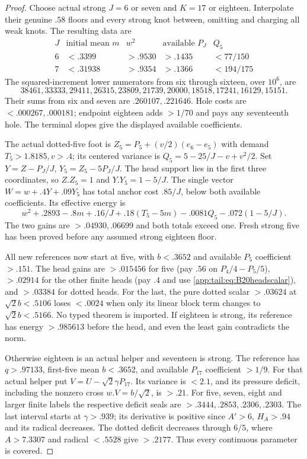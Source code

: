 \documentclass[11pt]{article}
\theoremstyle{definition}
\theoremstyle{remark}
\begin{document}
\begin{proof}
Choose actual strong $J=6$ or seven and $K=17$ or eighteen.
Interpolate their genuine $.58$ floors and every strong knot
between, omitting and charging all weak knots. The resulting data are
\[
\begin{array}{c|c|c|c|c}
J&\text{initial mean }m&w^2&\text{available }P_J&Q_5\\\hline
6&<.3399&>.9530&>.1435&<77/150\\
7&<.31938&>.9354&>.1366&<194/175
\end{array}
\]
The squared-increment lower numerators from six through sixteen,
over $10^6$, are
\[
38461,33333,29411,26315,23809,21739,20000,18518,17241,16129,15151.
\]
Their sums from six and seven are $.260107,.221646$.
Hole costs are $<.000267,.000181$; endpoint eighteen adds
$>1/70$ and pays any seventeenth hole. The terminal slopes give
the displayed available coefficients.

The actual dotted-five foot is
$Z_5=P_5+(v/2)(e_6-e_5)$ with demand $T_5>1.8185,v>.4$;
its centered variance is $Q_5=5-25/J-v+v^2/2$.
Set $Y=Z-P_J/J$, $Y_5=Z_5-5P_J/J$.
The head support lies in the first three coordinates, so
$Z.Z_5=1$ and $Y.Y_5=1-5/J$.
The single vector $W=w+.4Y+.09Y_5$ has total anchor cost
$.85/J$, below both available coefficients. Its effective energy is
\[
 w^2+.2893-.8m+.16/J+.18(T_5-5m)
                     -.0081Q_5-.072(1-5/J).
\]
The two gains are $>.04930,.06699$ and both totals exceed one.
Fresh strong five has been proved before any assumed strong
eighteen floor.

All new references now start at five, with $b<.3652$ and
available $P_5$ coefficient $>.151$.
The head gains are $>.015456$ for five (pay $.56$ on
$P_4/4-P_5/5$), $>.02914$ for the other finite heads
(pay $.4$ and use \eqref{app:tail:eq:B20headscalar}), and
$>.03384$ for dotted heads. For the last, the pure dotted
scalar $>.03624$ at $\sqrt2b<.5106$ loses $<.0024$ when
only its linear block term changes to $\sqrt2b<.5166$.
No typed theorem is imported.
If eighteen is strong, its reference has energy $>.985613$
before the head, and even the least gain contradicts the norm.

Otherwise eighteen is an actual helper and seventeen is strong.
The reference has $q>.97133$, first-five mean $b<.3652$,
and available $P_{17}$ coefficient $>1/9$.
For that actual helper put $V=U-\sqrt2\gamma P_{17}$.
Its variance is $<2.1$, and its pressure deficit, including
the nonzero cross $w.V=b/\sqrt2$, is $>.21$.
For five, seven, eight and larger finite labels the respective
deficit seals are $>.3444,.2853,.2306,.2303$.
The last interval starts at $\gamma>.939$; its derivative is
positive since $A'>6$, $H_A>.94$ and its radical decreases.
The dotted deficit decreases through $6/5$, where
$A>7.3307$ and radical $<.5528$ give $>.2177$.
Thus every continuous parameter is covered.


\end{proof}
\end{document}
